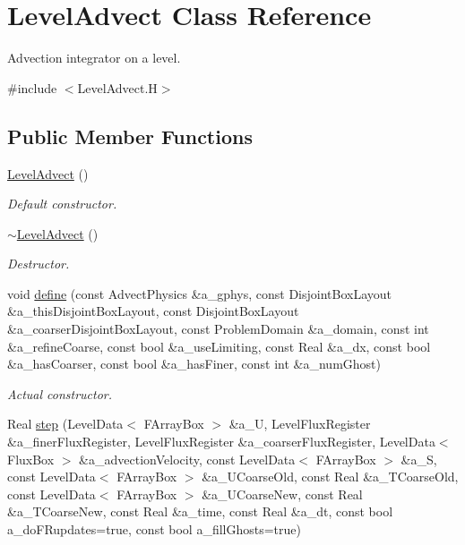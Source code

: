 \hypertarget{class_level_advect}{\section{Level\-Advect Class Reference}
\label{class_level_advect}
}


Advection integrator on a level.  




{\ttfamily \#include $<$Level\-Advect.\-H$>$}

\subsection*{Public Member Functions}
\begin{DoxyCompactItemize}
\item 
\hyperlink{class_level_advect_a87b0274e58afdb0058368ac6554592e5}{Level\-Advect} ()
\begin{DoxyCompactList}\small\item\em Default constructor. \end{DoxyCompactList}\item 
\hyperlink{class_level_advect_aeb34ed4774fb8e581789fd5a6ee2b4dd}{$\sim$\-Level\-Advect} ()
\begin{DoxyCompactList}\small\item\em Destructor. \end{DoxyCompactList}\item 
void \hyperlink{class_level_advect_aae945fee39376ceabd3fc46ea395e2fe}{define} (const Advect\-Physics \&a\-\_\-gphys, const Disjoint\-Box\-Layout \&a\-\_\-this\-Disjoint\-Box\-Layout, const Disjoint\-Box\-Layout \&a\-\_\-coarser\-Disjoint\-Box\-Layout, const Problem\-Domain \&a\-\_\-domain, const int \&a\-\_\-refine\-Coarse, const bool \&a\-\_\-use\-Limiting, const Real \&a\-\_\-dx, const bool \&a\-\_\-has\-Coarser, const bool \&a\-\_\-has\-Finer, const int \&a\-\_\-num\-Ghost)
\begin{DoxyCompactList}\small\item\em Actual constructor. \end{DoxyCompactList}\item 
Real \hyperlink{class_level_advect_a074ad96105762bb9796d642f07970c36}{step} (Level\-Data$<$ F\-Array\-Box $>$ \&a\-\_\-\-U, Level\-Flux\-Register \&a\-\_\-finer\-Flux\-Register, Level\-Flux\-Register \&a\-\_\-coarser\-Flux\-Register, Level\-Data$<$ Flux\-Box $>$ \&a\-\_\-advection\-Velocity, const Level\-Data$<$ F\-Array\-Box $>$ \&a\-\_\-\-S, const Level\-Data$<$ F\-Array\-Box $>$ \&a\-\_\-\-U\-Coarse\-Old, const Real \&a\-\_\-\-T\-Coarse\-Old, const Level\-Data$<$ F\-Array\-Box $>$ \&a\-\_\-\-U\-Coarse\-New, const Real \&a\-\_\-\-T\-Coarse\-New, const Real \&a\-\_\-time, const Real \&a\-\_\-dt, const bool a\-\_\-do\-F\-Rupdates=true, const bool a\-\_\-fill\-Ghosts=true)

\end{DoxyCompactItemize}
